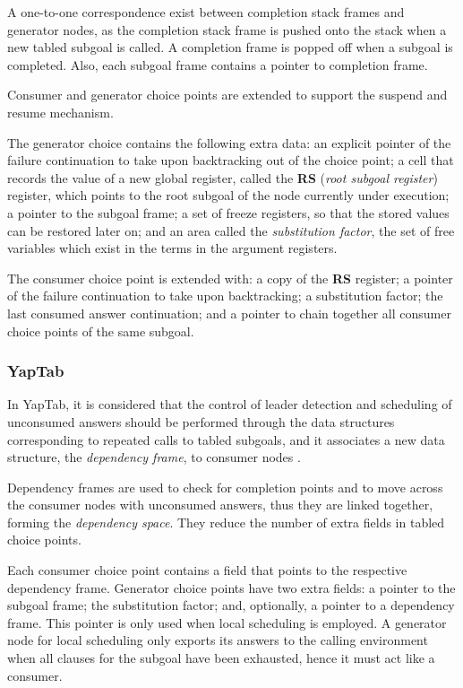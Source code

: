   A one-to-one correspondence exist between completion stack frames and generator nodes, as the completion stack frame
  is pushed onto the stack when a new tabled subgoal is called. A completion frame is popped off when a subgoal is
  completed. Also, each subgoal frame contains a pointer to completion frame.
  
  Consumer and generator choice points are extended to support the suspend and resume mechanism.
  
  The generator choice contains the following extra data: an explicit pointer of the failure continuation to take
  upon backtracking out of the choice point; a cell that records the value of a new global register,
  called the \textbf{RS} (\textit{root subgoal register}) register,
  which points to the root subgoal of the node currently under execution;
  a pointer to the subgoal frame; a set of freeze registers, so that the stored values can be restored later on;
  and an area called the \textit{substitution factor}, the set of free variables which exist in the terms in the argument registers.
  
  The consumer choice point is extended with: a copy of the \textbf{RS} register; a pointer of the failure continuation to take
  upon backtracking; a substitution factor; the last consumed answer continuation; and a pointer to chain
  together all consumer choice points of the same subgoal. 

  \subsubsection{YapTab}
  
  In YapTab, it is considered that the control of leader detection and scheduling of unconsumed answers should be
  performed through the data structures corresponding to repeated calls to tabled subgoals, and it associates a new
  data structure, the \textit{dependency frame}, to consumer nodes \cite{Rocha-00a}.
  
  Dependency frames are used to check for completion points and to move across the consumer nodes with unconsumed answers,
  thus they are linked together, forming the \textit{dependency space}.
  They reduce the number of extra fields in tabled choice points.
  
  Each consumer choice point contains a field that points to the respective dependency frame. Generator choice points
  have two extra fields: a pointer to the subgoal frame; the substitution factor; and, optionally, a pointer to a dependency frame. This pointer
  is only used when local scheduling is employed. A generator node for local scheduling only exports its answers to the calling
  environment when all clauses for the subgoal have been exhausted, hence it must act like a consumer.
  

